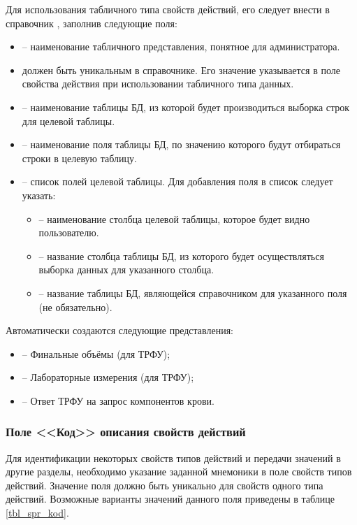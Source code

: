 Для использования табличного типа свойств действий, его следует внести в справочник , заполнив следующие поля:
\begin{itemize}
 \item {} – наименование табличного представления, понятное для администратора.
 \item {} должен быть уникальным в справочнике. Его значение указывается в поле  свойства действия при использовании табличного типа данных.
 \item {} – наименование таблицы БД, из которой будет производиться выборка строк для целевой таблицы.
 \item {} – наименование поля таблицы БД, по значению которого будут отбираться строки в целевую таблицу.
 \item {} – список полей целевой таблицы. Для добавления поля в список следует указать:
 \begin{itemize}
  \item {} – наименование столбца целевой таблицы, которое будет видно пользователю.
  \item {} – название столбца таблицы БД, из которого будет осуществляться выборка данных для указанного столбца.
  \item {} – название таблицы БД, являющейся справочником для указанного поля (не обязательно).
 \end{itemize}
\end{itemize}
  
Автоматически создаются следующие представления:
\begin{itemize}
 \item {} – Финальные объёмы (для ТРФУ);
 \item {} – Лабораторные измерения (для ТРФУ);
 \item {} – Ответ ТРФУ на запрос компонентов крови.
\end{itemize}

\subsubsection{Поле <<Код>> описания свойств действий} \label{spr_kod}

Для идентификации некоторых свойств типов действий и передачи значений в другие разделы, необходимо указание заданной мнемоники в поле  свойств типов действий. Значение поля  должно быть уникально для свойств одного типа действий. Возможные варианты значений данного поля приведены в таблице \ref{tbl_spr_kod}.

